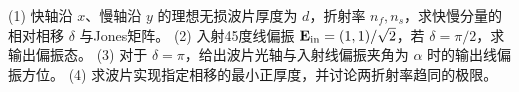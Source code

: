 (1) 快轴沿 \(x\)、慢轴沿 \(y\) 的理想无损波片厚度为 \(d\)，折射率 \(n_f,n_s\)，求快慢分量的相对相移 \(\delta\) 与Jones矩阵。
(2) 入射45度线偏振 \(\mathbf E_{\rm in}=(1,1)/\sqrt2\)，若 \(\delta=\pi/2\)，求输出偏振态。
(3) 对于 \(\delta=\pi\)，给出波片光轴与入射线偏振夹角为 \(\alpha\) 时的输出线偏振方位。
(4) 求波片实现指定相移的最小正厚度，并讨论两折射率趋同的极限。
